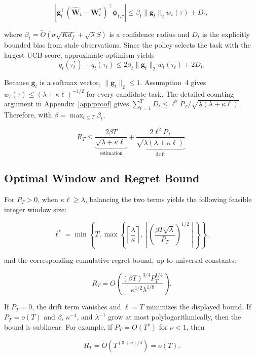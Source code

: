 \documentclass{article} %
\begin{document}
\[
\left|\mathbf{g}_t^\top(\widehat{\mathbf{W}}_t-\mathbf{W}_t^*)^\top\boldsymbol{\phi}_{t,\tau}\right|
\leq \beta_t\lVert\mathbf{g}_t\rVert_2w_t(\tau)+D_t,
\]

where \(\beta_t=\tilde{O}(\sigma\sqrt{K d_f}+\sqrt{\lambda}S)\) is a confidence radius and \(D_t\) is the explicitly bounded bias from stale observations. Since the policy selects the task with the largest UCB score, approximate optimism yields
\[
q_t(\tau_t^*)-q_t(\tau_t)
\leq 2\beta_t\lVert\mathbf{g}_t\rVert_2
 w_t(\tau_t)+2D_t.
\]

Because \(\mathbf{g}_t\) is a softmax vector, \(\lVert\mathbf{g}_t\rVert_2\leq1\). Assumption~4 gives \(w_t(\tau)\leq(\lambda+\kappa\ell)^{-1/2}\) for every candidate task. The detailed counting argument in Appendix~\ref{app:proof} gives \(\sum_{t=1}^{T}D_t\leq \ell^2P_T/\sqrt{\lambda(\lambda+\kappa\ell)}\). Therefore, with \(\beta=\max_{t\leq T}\beta_t\),

\[
    R_T \leq \underbrace{\frac{2\beta T}{\sqrt{\lambda+\kappa\ell}}}_{\text{estimation}}+\underbrace{\frac{2\ell^2P_T}{\sqrt{\lambda(\lambda+\kappa\ell)}}}_{\text{drift}}.
\]

\subsection{Optimal Window and Regret Bound}

For \(P_T>0\), when \(\kappa\ell\geq\lambda\), balancing the two terms yields the following feasible integer window size:

\[
    \ell^*=\min\!\left\{T,\max\!\left\{\left\lceil\frac{\lambda}{\kappa}\right\rceil,\left\lceil\left(\frac{\beta T\sqrt{\lambda}}{P_T}\right)^{1/2}\right\rceil\right\}\right\},
\]

and the corresponding cumulative regret bound, up to universal constants:

\[
    R_T=O\!\left(\frac{(\beta T)^{3/4}P_T^{1/4}}{\kappa^{1/2}\lambda^{1/8}}\right).
\]

If \(P_T=0\), the drift term vanishes and \(\ell=T\) minimizes the displayed bound. If \(P_T=o(T)\) and \(\beta\), \(\kappa^{-1}\), and \(\lambda^{-1}\) grow at most polylogarithmically, then the bound is sublinear. For example, if \(P_T=O(T^\nu)\) for \(\nu<1\), then

\[
    R_T=\tilde{O}\!\left(T^{(3+\nu)/4}\right)=o(T).
\]








% 
% 


\end{document}
